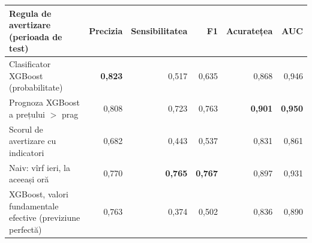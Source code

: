 \begin{tabular}{lrrrrr}
\toprule
Regula de avertizare (perioada de test) & Precizia & Sensibilitatea & F1 & Acuratețea & AUC \\
\midrule
Clasificator XGBoost (probabilitate) & \textbf{0,823} & 0,517 & 0,635 & 0,868 & 0,946 \\
Prognoza XGBoost a prețului $>$ prag & 0,808 & 0,723 & 0,763 & \textbf{0,901} & \textbf{0,950} \\
Scorul de avertizare cu indicatori & 0,682 & 0,443 & 0,537 & 0,831 & 0,861 \\
Naiv: vîrf ieri, la aceeași oră & 0,770 & \textbf{0,765} & \textbf{0,767} & 0,897 & 0,931 \\
XGBoost, valori fundamentale efective (previziune perfectă) & 0,763 & 0,374 & 0,502 & 0,836 & 0,890 \\
\bottomrule
\end{tabular}
